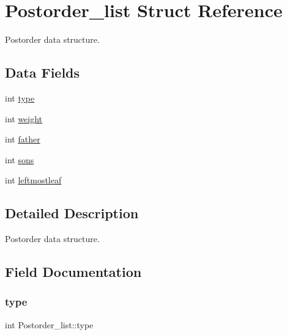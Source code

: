 \hypertarget{struct_postorder__list}{}\section{Postorder\+\_\+list Struct Reference}
\label{struct_postorder__list}


Postorder data structure.  


\subsection*{Data Fields}
\begin{DoxyCompactItemize}
\item 
int \mbox{\hyperlink{struct_postorder__list_ad343960ea507b59bdca376ac0526e47e}{type}}
\item 
int \mbox{\hyperlink{struct_postorder__list_a3e51b5eb1abf664a859e19112280abb4}{weight}}
\item 
int \mbox{\hyperlink{struct_postorder__list_ab41ab9f9394007a89d316e75b76acfab}{father}}
\item 
int \mbox{\hyperlink{struct_postorder__list_a058d36bce140d937db829fcd2067af9f}{sons}}
\item 
int \mbox{\hyperlink{struct_postorder__list_a23626266a53e5d2860905d1f16658afc}{leftmostleaf}}
\end{DoxyCompactItemize}


\subsection{Detailed Description}
Postorder data structure. 

\subsection{Field Documentation}
\mbox{\label{struct_postorder__list_ad343960ea507b59bdca376ac0526e47e}} 
\subsubsection{\texorpdfstring{type}{type}}
{\footnotesize\ttfamily int Postorder\+\_\+list\+::type}

\mbox{\label{struct_postorder__list_a3e51b5eb1abf664a859e19112280abb4}} 
